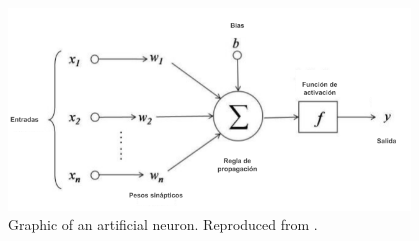 \begin{figure}[h!]
  \begin{center}	\includegraphics[width=0.95\textwidth, frame]{imagenes/Cap4/neurona_artificial}
  \caption{Graphic of an artificial neuron. Reproduced from \protect\cite{Reference68}.}
  \label{fig:neurona}
  \end{center}
\end{figure}

